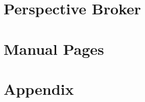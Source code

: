 \documentclass[oneside]{book}
\begin{document}


\chapter{Perspective Broker}






\chapter{Manual Pages}


\clearpage

\clearpage

\clearpage

\clearpage

\clearpage


\chapter{Appendix}



\end{document}
